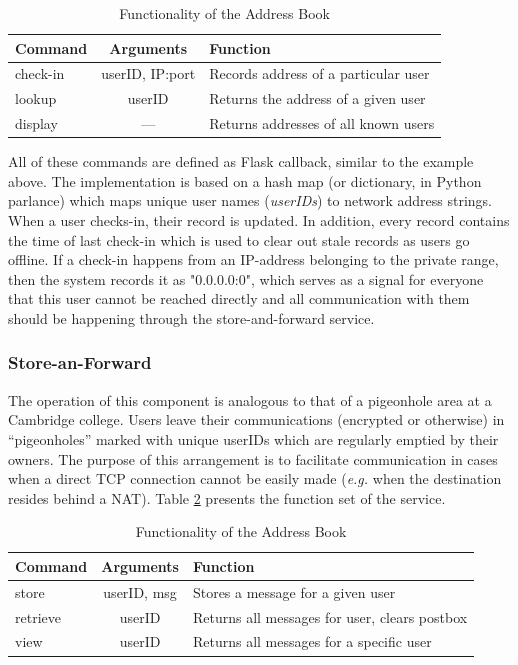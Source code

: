 \documentclass[a4paper, twoside, 12pt]{report}
\begin{document}
\begin{table}[H]
\centering
\begin{tabular*}{0.9\textwidth}{l | c | l}
    Command & Arguments & Function \\
    \hline
    check-in & userID, IP:port& Records address of a particular user \\
    lookup & userID & Returns the address of a given user \\
    display & ---  & Returns addresses of all known users \\
\end{tabular*}
\caption{\label{tab:address_book} Functionality of the Address Book}
\end{table}

All of these commands are defined as Flask callback, similar to the example above. The implementation is based on a hash map (or dictionary, in Python parlance) which maps unique user names (\emph{userIDs}) to network address strings. When a user checks-in, their record is updated. In addition, every record contains the time of last check-in which is used to clear out stale records as users go offline. If a check-in happens from an IP-address belonging to the private range, then the system records it as "0.0.0.0:0", which serves as a signal for everyone that this user cannot be reached directly and all communication with them should be happening through the store-and-forward service.

\subsubsection{Store-an-Forward}
The operation of this component is analogous to that of a pigeonhole area at a Cambridge college. Users leave their communications (encrypted or otherwise) in ``pigeonholes'' marked with unique userIDs which are regularly emptied by their owners. The purpose of this arrangement is to facilitate communication in cases when a direct TCP connection cannot be easily made (\textit{e.g.} when the destination resides behind a NAT). Table \ref{tab:saf} presents the function set of the service.

\begin{table}[H]
\centering
\begin{tabular*}{0.9\textwidth}{l | c | l}
    Command & Arguments & Function \\
    \hline
    store & userID, msg & Stores a message for a given user \\
    retrieve & userID & Returns all messages for user, clears postbox\\
    view & userID & Returns all messages for a specific user \\
\end{tabular*}
\caption{\label{tab:saf} Functionality of the Address Book}
\end{table}
\end{document}

